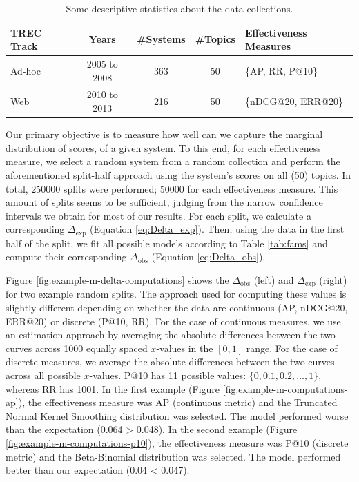 \begin{table}[t]
	\centering
	\begin{tabular}{l c c c l}
		\toprule
		TREC Track & Years & \#Systems & \#Topics & Effectiveness Measures \\
		\midrule
		Ad-hoc & 2005 to 2008 & 363 & 50 & \{AP, RR, P@10\} \\
		Web & 2010 to 2013 & 216 & 50 & \{nDCG@20, ERR@20\} \\
		\bottomrule
	\end{tabular}
	\caption{Some descriptive statistics about the data collections.}
	\label{tab:dataset-descriptive-stats}
\end{table} 

Our primary objective is to measure how well can we capture the marginal distribution of scores, of a given system. To this end, for each effectiveness measure, we select a random system from a random collection and perform the aforementioned split-half approach using the system's scores on all (50) topics. In total, \num{250000} splits were performed; \num{50000} for each effectiveness measure. This amount of splits seems to be sufficient, judging from the narrow confidence intervals we obtain for most of our results. For each split, we calculate a corresponding $\Delta_{\text{exp}}$ (Equation \ref{eq:Delta_exp}). Then, using the data in the first half of the split, we fit all possible models according to Table \ref{tab:fams} and compute their corresponding $\Delta_{\text{obs}}$ (Equation \ref{eq:Delta_obs}). 

Figure \ref{fig:example-m-delta-computations} shows the $\Delta_{\text{obs}}$ (left) and $\Delta_{\text{exp}}$ (right) for two example random splits. The approach used for computing these values is slightly different depending on whether the data are continuous (AP, nDCG@20, ERR@20) or discrete (P@10, RR). For the case of continuous measures, we use an estimation approach by averaging the absolute differences between the two curves across 1000 equally spaced $x$-values in the $\left[0,1\right]$ range. For the case of discrete measures, we average the absolute differences between the two curves across all possible $x$-values. P@10 has 11 possible values: ${\{0, 0.1, 0.2, \dots, 1\}}$, whereas RR has 1001. In the first example (Figure \ref{fig:example-m-computations-ap}), the effectiveness measure was AP (continuous metric) and the Truncated Normal Kernel Smoothing distribution was selected. The model performed worse than the expectation (0.064 > 0.048). In the second example (Figure \ref{fig:example-m-computations-p10}), the effectiveness measure was P@10 (discrete metric) and the Beta-Binomial distribution was selected. The model performed better than our expectation (0.04 < 0.047). 

